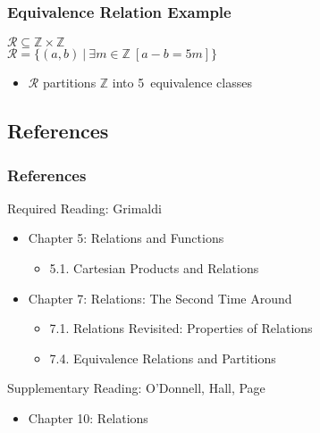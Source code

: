 \documentclass[dvipsnames]{beamer}
\begin{document}
\begin{frame}
  \frametitle{Equivalence Relation Example}

  \begin{example}
    $\mathcal{R} \subseteq \mathbb{Z} \times \mathbb{Z}$\\
    $\mathcal{R} = \{(a,b)~|~\exists m \in \mathbb{Z}~[a - b = 5m]\}$

    \bigskip
    \begin{itemize}
      \item $\mathcal{R}$ partitions $\mathbb{Z}$ into 5~equivalence classes
    \end{itemize}

  \end{example}
\end{frame}

\subsection*{References}

\begin{frame}
  \frametitle{References}

  \begin{block}{Required Reading: Grimaldi}
    \begin{itemize}
      \item Chapter 5: Relations and Functions
      \begin{itemize}
        \item 5.1. \alert{Cartesian Products and Relations}
      \end{itemize}
      \item Chapter 7: Relations: The Second Time Around
      \begin{itemize}
        \item 7.1. \alert{Relations Revisited: Properties of Relations}
        \item 7.4. \alert{Equivalence Relations and Partitions}
      \end{itemize}
    \end{itemize}
  \end{block}

  \begin{block}{Supplementary Reading: O'Donnell, Hall, Page}
    \begin{itemize}
      \item Chapter 10: Relations
    \end{itemize}
  \end{block}
\end{frame}
\end{document}
